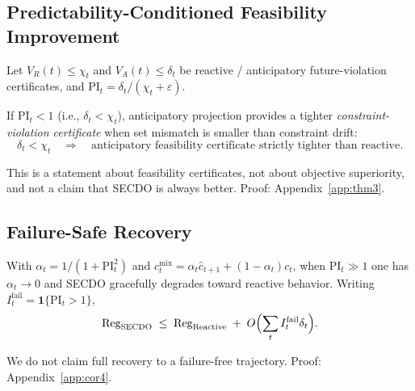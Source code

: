 \subsection{Predictability-Conditioned Feasibility Improvement}
Let $V_R(t)\le\chi_t$ and $V_A(t)\le\delta_t$ be reactive / anticipatory future-violation certificates, and $\mathrm{PI}_t=\delta_t/(\chi_t+\varepsilon)$.
\begin{theorem}
\label{thm:3}
If $\mathrm{PI}_t<1$ (i.e., $\delta_t<\chi_t$), anticipatory projection provides a tighter \emph{constraint-violation certificate} when set mismatch is smaller than constraint drift:
\begin{equation}
\delta_t<\chi_t
\quad\Rightarrow\quad
\text{anticipatory feasibility certificate strictly tighter than reactive}.
\end{equation}
\end{theorem}
This is a statement about feasibility certificates, not about objective superiority, and not a claim that SECDO is always better.
Proof: Appendix~\ref{app:thm3}.

\subsection{Failure-Safe Recovery}
\begin{corollary}
\label{cor:4}
With $\alpha_t=1/(1+\mathrm{PI}_t^2)$ and $c^{\mathrm{mix}}_t=\alpha_t\hat c_{t+1}+(1-\alpha_t)c_t$,
when $\mathrm{PI}_t\gg 1$ one has $\alpha_t\to 0$ and SECDO gracefully degrades toward reactive behavior.
Writing $I_t^{\mathrm{fail}}=\mathbf{1}\{\mathrm{PI}_t>1\}$,
\begin{equation}
\mathrm{Reg}_{\mathrm{SECDO}}
\;\le\;
\mathrm{Reg}_{\mathrm{Reactive}}
\;+\;
O\Bigl(\sum_t I_t^{\mathrm{fail}}\delta_t\Bigr).
\end{equation}
\end{corollary}
We do not claim full recovery to a failure-free trajectory.
Proof: Appendix~\ref{app:cor4}.
